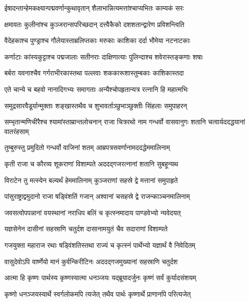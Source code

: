 \twolineshloka
{ईषादन्तान्हेमकक्ष्यान्पद्मवर्णान्कुथावृतान्}
{शैलाभान्नित्यमत्तांश्चाप्यभितः काम्यकं सरः}


\twolineshloka
{क्षमावतः कुलीनांश्च कुञ्जरान्सपरिच्छदान्}
{दत्त्वैकैको दशशतान्द्वारेण प्रविशन्त्विति}


\twolineshloka
{वैदेहकाश्च पुण्ड्राश्च गौलेयास्ताम्रलिप्तकाः}
{मरुकाः काशिका दर्दा भौमेया नटनाटकाः}


\twolineshloka
{कर्णाटाः कांस्यकुट्टाश्च पद्मजालाः सतीनराः}
{दाक्षिणात्याः पुलिन्दाश्च शवेरास्तङ्कणाः शषाः}


\twolineshloka
{बर्बरा यवनाश्चैव गर्गराभीरकास्तथा}
{पल्लवाः शककारूशास्तुम्बकाः काशिकास्तदा}


\twolineshloka
{एते चान्ये च बहवो नानादिगभ्यः समागताः}
{अन्यैश्चोपहृतान्यत्र रत्नानि हि महात्मभिः}


\twolineshloka
{समुद्रसारवैडूर्यान्मुक्ताः शङ्खास्तथैव च}
{शुभावर्ताञ्छुभाञ्छुक्तीः सिंहलाः समुपाहरन्}


\threelineshloka
{सम्भृतान्मणिचीरैश्च श्यामांस्ताम्रान्तलोचनान्}
{राजा चित्ररथो नाम गन्धर्वो वासवानुगः}
{शतानि चत्वार्यददद्धयानां वातरंहसाम्}


\twolineshloka
{तुम्बुरुस्तु प्रमुदितो गन्धर्वो वाजिनां शतम्}
{आम्रपत्रसवर्णानामददद्धेममालिनाम्}


\twolineshloka
{कृती राजा च कौरव्य शूकराणां विशाम्पते}
{अददद्गजरत्नानां शतानि सुबहून्यथ}


\twolineshloka
{विराटेन तु मत्स्येन बल्यर्थं हेममालिनाम्}
{कुञ्जराणां सहस्रे द्वे मत्तानां समुपाहृते}


\twolineshloka
{पांसुराष्ट्राद्वमुदानो राजा षड्विंशतिं गजान्}
{अश्वानां चसहस्रे द्वे राजन्काञ्चनमालिनाम्}


\twolineshloka
{जवसत्वोपपन्नानां वयस्थानां नराधिप}
{बलिं च कृत्स्नमादाय पाण्डवेभ्यो न्यवेदयत्}


\twolineshloka
{यज्ञसेनेन दासीनां सहस्राणि चतुर्दश}
{दासानामयुतं चैव सदाराणां विशाम्पते}


\twolineshloka
{गजयुक्ता महाराज रथाः षड्विंशतिस्तथा}
{राज्यं च कृत्स्नं पार्थेभ्यो यज्ञार्थं वै निवेदितम्}


\twolineshloka
{वासुदेवोऽपि वार्ष्णेयो मानं कुर्वन्किरीटिनः}
{अददद्गजमुख्यानां सहस्राणि चतुर्दश}


\twolineshloka
{आत्मा हि कृष्णः पार्थस्य कृष्णस्यात्मा धनञ्जयः}
{यद्ब्रूयादर्जुनः कृष्णं सर्वं कुर्यादसंशयम्}


\twolineshloka
{कृष्णो धनञ्जयस्यार्थे स्वर्गलोकमपि त्यजेत्}
{तथैव पार्थः कृष्णार्थे प्राणानपि परित्यजेत्}


